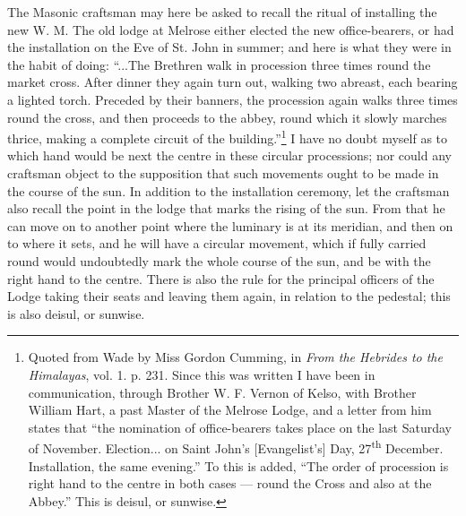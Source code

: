 \documentclass[a4paper, 11pt, oneside, polutonikogreek, english]{article}
\begin{document}
The Masonic craftsman may here be asked to recall the ritual of installing the new W. M. The old lodge at Melrose either elected the new office-bearers, or had the installation on the Eve of St. John in summer; and here is what they were in the habit of doing: ``...The Brethren walk in procession three times round the market cross. After dinner they again turn out, walking two abreast, each bearing a lighted torch. Preceded by their banners, the procession again walks three times round the cross, and then proceeds to the abbey, round which it slowly marches thrice, making a complete circuit of the building.''\footnote{Quoted from Wade by Miss Gordon Cumming, in \emph{From the Hebrides to the Himalayas}, vol. 1. p. 231. Since this was written I have been in communication, through Brother W. F. Vernon of Kelso, with Brother William Hart, a past Master of the Melrose Lodge, and a letter from him states that ``the nomination of office-bearers takes place on the last Saturday of November. Election... on Saint John's [Evangelist's] Day, 27\textsuperscript{th} December. Installation, the same evening.'' To this is added, ``The order of procession is right hand to the centre in both cases --- round the Cross and also at the Abbey.'' This is deisul, or sunwise.} I have no doubt myself as to which hand would be next the centre in these circular processions; nor could any craftsman object to the supposition that such movements ought to be made in the course of the sun. In addition to the installation ceremony, let the craftsman also recall the point in the lodge that marks the rising of the sun. From that he can move on to another point where the luminary is at its meridian, and then on to where it sets, and he will have a circular movement, which if fully carried round would undoubtedly mark the whole course of the sun, and be with the right hand to the centre. There is also the rule for the principal officers of the Lodge taking their seats and leaving them again, in relation to the pedestal; this is also deisul, or sunwise.
\end{document}
